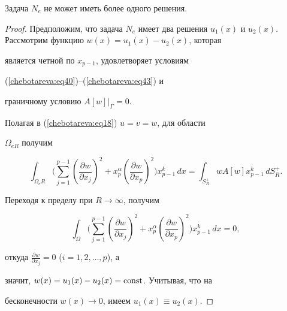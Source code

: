 \begin{theorem}[4]Задача $N_e $ не может иметь более одного решения.


\end{theorem}


\begin{proof}


Предположим,  что задача $N_e $ имеет два решения $u_1 (x)$ и $u_2


(x)$. Рассмотрим функцию $w(x) = u_1 (x) - u_2 (x)$,  которая


является четной по $x_{p - 1} $,  удовлетворяет условиям


(\ref{chebotareva:eq40})--(\ref{chebotareva:eq43}) и


граничному условию $A\left[ w \right]\big|_\Gamma = 0$.





Полагая в (\ref{chebotareva:eq18}) $u = v = w$,  для области


$\Omega _{eR} $ получим


\[


\int_{\Omega _e R} \Biggl( \sum\limits_{j = 1}^{p - 1}


{\left( {\frac{\partial w}{\partial x_j }} \right)^2 + x_p^\alpha


\left( {\frac{\partial w}{\partial x_p }} \right)^2}  \Biggr)x_{p


- 1}^k \,dx = \int_{S_R^ + } {wA\left[ w \right]} x_{p -


1}^k \,dS_R^ + .


\]


Переходя к пределу при $R \to \infty $, получим


\[


\int_\Omega \Biggl( \sum\limits_{j = 1}^{p - 1} \left(


{\frac{\partial w}{\partial x_j }} \right)^2 + x_p^\alpha \left(


{\frac{\partial w}{\partial x_p }} \right)^2  \Biggr)x_{p - 1}^k\,


dx = 0, 


\]


откуда $\frac{\partial w}{\partial x_j } = 0$ ($i = 1,  2,  \dots,  p$),  а


значит, $w(x) = u_1 (x) - u_2 (x) = \rm  const$. Учитывая,  что на


бесконечности $w(x) \to 0$,  имеем $u_1 (x) \equiv u_2 (x)$.


\end{proof}





